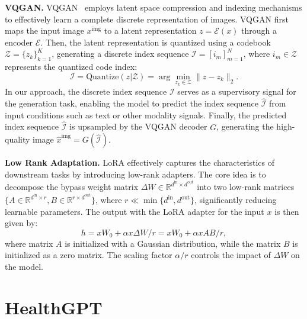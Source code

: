 \noindent\textbf{VQGAN.}
VQGAN~\cite{esser2021taming} employs latent space compression and indexing mechanisms to effectively learn a complete discrete representation of images. VQGAN first maps the input image $x^{\text{img}}$ to a latent representation $z = \mathcal{E}(x)$ through a encoder $\mathcal{E}$. Then, the latent representation is quantized using a codebook $\mathcal{Z} = \{z_k\}_{k=1}^K$, generating a discrete index sequence $\mathcal{I} = [i_m]_{m=1}^N$, where $i_m \in \mathcal{Z}$ represents the quantized code index:
\begin{equation}
    \mathcal{I} = \text{Quantize}(z|\mathcal{Z}) = \arg\min_{z_k \in \mathcal{Z}} \| z - z_k \|_2.
\end{equation}
In our approach, the discrete index sequence $\mathcal{I}$ serves as a supervisory signal for the generation task, enabling the model to predict the index sequence $\hat{\mathcal{I}}$ from input conditions such as text or other modality signals.  
Finally, the predicted index sequence $\hat{\mathcal{I}}$ is upsampled by the VQGAN decoder $G$, generating the high-quality image $\hat{x}^\text{img} = G(\hat{\mathcal{I}})$.



\noindent\textbf{Low Rank Adaptation.} 
LoRA\cite{hu2021lora} effectively captures the characteristics of downstream tasks by introducing low-rank adapters. The core idea is to decompose the bypass weight matrix $\Delta W\in\mathbb{R}^{d^{\text{in}} \times d^{\text{out}}}$ into two low-rank matrices $ \{A \in \mathbb{R}^{d^{\text{in}} \times r}, B \in \mathbb{R}^{r \times d^{\text{out}}} \}$, where $ r \ll \min\{d^{\text{in}}, d^{\text{out}}\} $, significantly reducing learnable parameters. The output with the LoRA adapter for the input $x$ is then given by:
\begin{equation}
    h = x W_0 + \alpha x \Delta W/r = x W_0 + \alpha xAB/r,
\end{equation}
where matrix $ A $ is initialized with a Gaussian distribution, while the matrix $ B $ is initialized as a zero matrix. The scaling factor $ \alpha/r $ controls the impact of $ \Delta W $ on the model.

\section{HealthGPT}
\label{Method}


